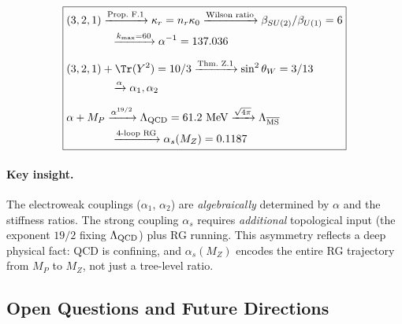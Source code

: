 \begin{equation}
\boxed{
\begin{aligned}
&(3,2,1) \xrightarrow{\text{Prop.~F.1}} \kappa_r = n_r\kappa_0
\xrightarrow{\text{Wilson ratio}} \beta_{SU(2)}/\beta_{U(1)} = 6 \\
&\qquad\qquad \xrightarrow{k_{\max}=60} \alpha^{-1} = 137.036 \\[6pt]
&(3,2,1) + \Tr(Y^2) = 10/3 \xrightarrow{\text{Thm.~Z.1}} \sin^2\theta_W = 3/13 \\
&\qquad\qquad \xrightarrow{\alpha} \alpha_1, \alpha_2 \\[6pt]
&\alpha + M_P \xrightarrow{\alpha^{19/2}} \Lambda_{\rm QCD} = 61.2~\text{MeV}
\xrightarrow{\sqrt{4\pi}} \Lambda_{\overline{\rm MS}} \\
&\qquad\qquad \xrightarrow{\text{4-loop RG}} \alpha_s(M_Z) = 0.1187
\end{aligned}
}
\end{equation}

\paragraph{Key insight.}
The electroweak couplings ($\alpha_1$, $\alpha_2$) are \emph{algebraically} determined by
$\alpha$ and the stiffness ratios. The strong coupling $\alpha_s$ requires \emph{additional}
topological input (the exponent $19/2$ fixing $\Lambda_{\rm QCD}$) plus RG running.
This asymmetry reflects a deep physical fact: QCD is confining, and $\alpha_s(M_Z)$
encodes the entire RG trajectory from $M_P$ to $M_Z$, not just a tree-level ratio.

\subsection{Open Questions and Future Directions}

